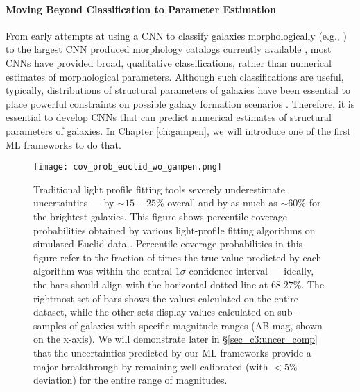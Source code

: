 \paragraph{Moving Beyond Classification to Parameter Estimation} From early attempts at using a CNN to classify galaxies morphologically (e.g.,  \citealp{Dieleman2015Rotation-invariantPrediction}) to the largest CNN produced morphology catalogs currently available \citep{Cheng2021GalaxyNetworks, Vega-Ferrero2021PushingSurvey}, most CNNs have provided broad, qualitative classifications, rather than 
numerical estimates of morphological parameters. Although such classifications are useful, typically, distributions of structural parameters of galaxies have been essential to place powerful constraints on possible galaxy formation scenarios \citep[e.g.,][]{Kauffmann2004TheGalaxies,Weinmann2006PropertiesMass,Schawinski2007TheGalaxies,vanderWel2008TheMass,Schawinski2014TheGalaxies}. Therefore, it is essential to develop CNNs that can predict numerical estimates of structural parameters of galaxies. In Chapter \ref{ch:gampen}, we will introduce one of the first ML frameworks to do that. 

\begin{figure}[htbp]
    \centering
    \texttt{[image: cov\_prob\_euclid\_wo\_gampen.png]}
    \caption{Traditional light profile fitting tools severely underestimate uncertainties --- by $\sim15-25\%$ overall and by as much as $\sim60\%$ for the brightest galaxies. This figure shows percentile coverage probabilities obtained by various light-profile fitting algorithms on simulated Euclid data \citep[][]{euclid_morph}. Percentile coverage probabilities in this figure refer to the fraction of times the true value predicted by each algorithm was within the central $1\sigma$ confidence interval --- ideally, the bars should align with the horizontal dotted line at $68.27\%$. The rightmost set of bars shows the values calculated on the entire dataset, while the other sets display values calculated on sub-samples of galaxies with specific magnitude ranges (AB mag, shown on the x-axis). We will demonstrate later in \S \ref{sec_c3:uncer_comp} that the uncertainties predicted by our ML frameworks provide a major breakthrough by remaining well-calibrated (with $<5\%$ deviation) for the entire range of magnitudes.}
    \label{fig_intro:uncertainties}
\end{figure}

